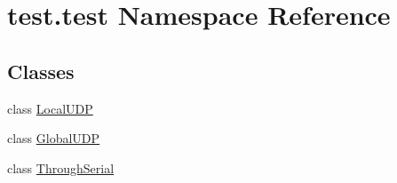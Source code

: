 \hypertarget{namespacetest_1_1test}{\section{test.\-test Namespace Reference}
\label{namespacetest_1_1test}
}
\subsection*{Classes}
\begin{DoxyCompactItemize}
\item 
class \hyperlink{classtest_1_1test_1_1LocalUDP}{Local\-U\-D\-P}
\item 
class \hyperlink{classtest_1_1test_1_1GlobalUDP}{Global\-U\-D\-P}
\item 
class \hyperlink{classtest_1_1test_1_1ThroughSerial}{Through\-Serial}
\end{DoxyCompactItemize}
